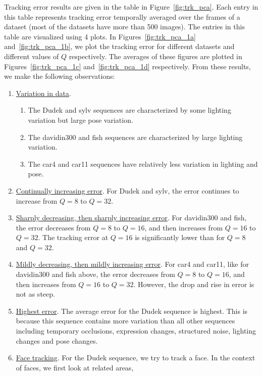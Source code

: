 Tracking error results are given in the table in Figure~\ref{fig:trk_pca}.  Each entry in this table represents tracking error temporally averaged over the frames of a dataset (most of the datasets have more than 500 images).  The entries in this table are visualized using 4 plots.  In Figures~\ref{fig:trk_pca_1a} and~\ref{fig:trk_pca_1b}, we plot the tracking error for different datasets and different values of $Q$ respectively.  The averages of these figures are plotted in Figures~\ref{fig:trk_pca_1c} and~\ref{fig:trk_pca_1d} respectively.  From these results, we make the following observations:


\begin{enumerate}
\item \underline{Variation in data}.
\begin{enumerate}
\item The Dudek and sylv sequences are characterized by some lighting variation but large pose variation.
\item The davidin300 and fish sequences are characterized by large lighting variation.
\item The car4 and car11 sequences have relatively less variation in lighting and pose.
\end{enumerate}
\item \underline{Continually increasing error}.  For Dudek and sylv, the error continues to increase from $Q=8$ to $Q=32$.
\item \underline{Sharply decreasing, then sharply increasing error}. For davidin300 and fish, the error decreases from $Q=8$ to $Q=16$, and then increases from $Q=16$ to $Q=32$.   The tracking error at $Q=16$ is significantly lower than for $Q=8$ and $Q=32$.
\item \underline{Mildly decreasing, then mildly increasing error}.  For car4 and car11, like for davidin300 and fish above, the error decreases from $Q=8$ to $Q=16$, and then increases from $Q=16$ to $Q=32$.  However, the drop and rise in error is not as steep.
\item \underline{Highest error}.  The average error for the Dudek sequence is highest.  This is because this sequence contains more variation than all other sequences including temporary occlusions, expression changes, structured noise, lighting changes and pose changes.  
\item \underline{Face tracking}.  For the Dudek sequence, we try to track a face.  In the context of faces, we first look at related areas,


\end{enumerate}
